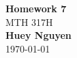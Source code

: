 \begin{titlepage}
    \begin{center}
    {\fontsize{40}{48}\selectfont \bfseries Homework 7} 
    \\\vspace{20pt}
    {\LARGE MTH 317H} \\
    \vspace{20pt}
    \textbf{Huey Nguyen}
    \vspace{8pt}
    \\\today
    \end{center}
\end{titlepage}